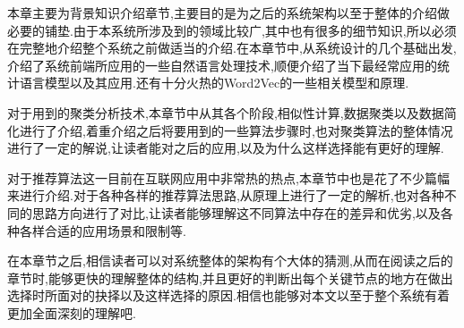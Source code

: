 本章主要为背景知识介绍章节,主要目的是为之后的系统架构以至于整体的介绍做必要的铺垫.由于本系统所涉及到的领域比较广,其中也有很多的细节知识,所以必须在完整地介绍整个系统之前做适当的介绍.在本章节中,从系统设计的几个基础出发,介绍了系统前端所应用的一些自然语言处理技术,顺便介绍了当下最经常应用的统计语言模型以及其应用.还有十分火热的Word2Vec的一些相关模型和原理.

对于用到的聚类分析技术,本章节中从其各个阶段,相似性计算,数据聚类以及数据简化进行了介绍,着重介绍之后将要用到的一些算法步骤时,也对聚类算法的整体情况进行了一定的解说,让读者能对之后的应用,以及为什么这样选择能有更好的理解.

对于推荐算法这一目前在互联网应用中非常热的热点,本章节中也是花了不少篇幅来进行介绍.对于各种各样的推荐算法思路,从原理上进行了一定的解析,也对各种不同的思路方向进行了对比,让读者能够理解这不同算法中存在的差异和优劣,以及各种各样合适的应用场景和限制等.

在本章节之后,相信读者可以对系统整体的架构有个大体的猜测,从而在阅读之后的章节时,能够更快的理解整体的结构,并且更好的判断出每个关键节点的地方在做出选择时所面对的抉择以及这样选择的原因.相信也能够对本文以至于整个系统有着更加全面深刻的理解吧.






